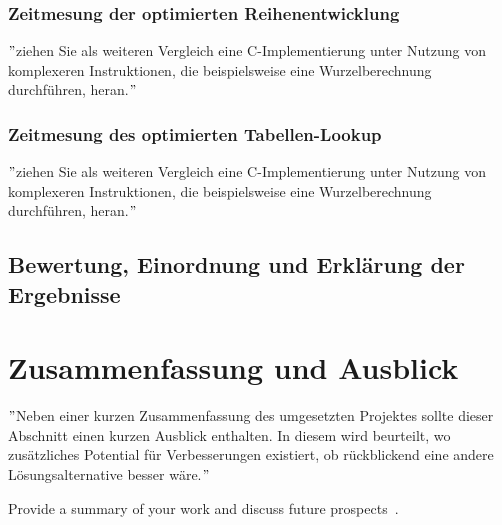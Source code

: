 \documentclass[course=erap]{aspdoc}
\begin{document}
    \subsubsection{Zeitmesung der optimierten Reihenentwicklung}
    \("\)ziehen Sie als weiteren Vergleich eine C-Implementierung unter Nutzung von komplexeren Instruktionen, die beispielsweise eine Wurzelberechnung durchführen, heran.\("\)

    \subsubsection{Zeitmesung des optimierten Tabellen-Lookup}
    \("\)ziehen Sie als weiteren Vergleich eine C-Implementierung unter Nutzung von komplexeren Instruktionen, die beispielsweise eine Wurzelberechnung durchführen, heran.\("\)

    \subsection{Bewertung, Einordnung und Erklärung der Ergebnisse}


    \section{Zusammenfassung und Ausblick}
    \("\)Neben einer kurzen Zusammenfassung des umgesetzten Projektes sollte dieser Abschnitt einen kurzen Ausblick enthalten.
    In diesem wird beurteilt, wo zusätzliches Potential für Verbesserungen existiert, ob rückblickend eine andere
    Lösungsalternative besser wäre.\("\)

    Provide a summary of your work and discuss future prospects~\cite{intel2017man}.


    
    {}
\end{document}
